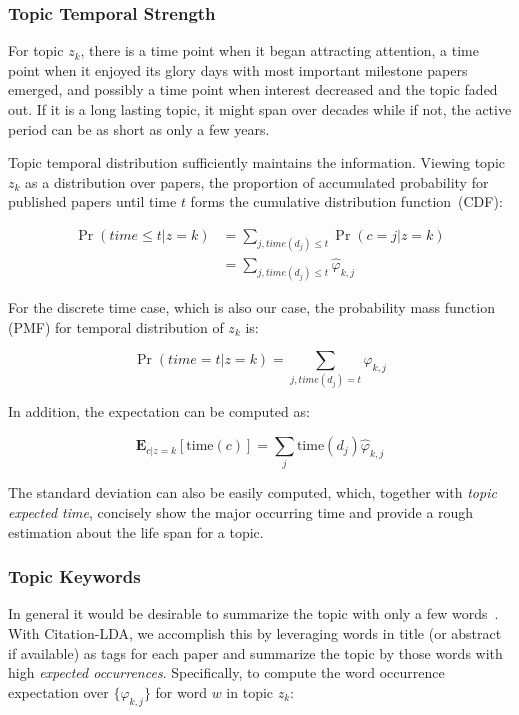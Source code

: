 \subsubsection{Topic Temporal Strength}

For topic $z_k$, there is a time point when it began attracting attention, a
time point when it enjoyed its glory days with most important milestone papers
emerged, and possibly a time point when interest decreased and the topic faded
out. If it is a long lasting topic, it might span over decades while if not, the
active period can be as short as only a few years.

Topic temporal distribution sufficiently maintains the information. Viewing
topic $z_k$ as a distribution over papers, the proportion of accumulated
probability for published papers until time $t$ forms the cumulative
distribution function~(CDF):

\begin{align}
\Pr(time \leq t |z = k)
  &= \sum\limits_{j, time(d_j) \leq t} \Pr(c=j | z=k) \nonumber\\
	&= \sum\limits_{j,time(d_j) \leq t} \hat\varphi_{k,j}
  \label{eq::citation_time1}
\end{align}

For the discrete time case, which is also our case, the probability mass
function (PMF) for temporal distribution of $z_k$ is:

\begin{equation}
  \Pr(time = t |z = k)	= \sum\limits_{j,time(d_j) = t} \hat\varphi_{k,j}
  \label{eq::citation_time2}
\end{equation}

In addition, the expectation can be computed as:

\begin{equation}
  \mathbf{E}_{c | z=k} [\mathrm{time}(c)]  =
  \sum\limits_j \mathrm{time}(d_j) \hat\varphi_{k,j} \label{eq::citation_time3}
\end{equation}

The standard deviation can also be easily computed, which, together with
\emph{topic expected time}, concisely show the major occurring time and provide
a rough estimation about the life span for a topic.

\subsubsection{Topic Keywords}

In general it would be desirable to summarize the topic with only a few
words~\cite{boyd2009reading}. With Citation-LDA, we accomplish this by
leveraging words in title (or abstract if available) as tags for each paper and
summarize the topic by those words with high \emph{expected occurrences}.
Specifically, to compute the word occurrence expectation over
$\{\hat\varphi_{k,j}\}$ for word $w$ in topic $z_k$:

